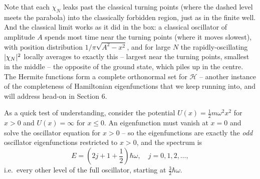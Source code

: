 \documentclass[a4paper]{scrartcl}
\begin{document}
\begin{center}
\end{center}

Note that each $\chi_N$ leaks past the classical turning points (where the dashed level meets the parabola) into the classically forbidden region, just as in the finite well. And the classical limit works as it did in the box: a classical oscillator of amplitude $A$ spends most time near the turning points (where it moves slowest), with position distribution $1/\pi\sqrt{A^2 - x^2}$, and for large $N$ the rapidly-oscillating $\lvert\chi_N\rvert^2$ locally averages to exactly this -- largest near the turning points, smallest in the middle -- the opposite of the ground state, which piles up in the centre. The Hermite functions form a complete orthonormal set for $\mathcal{H}$ -- another instance of the completeness of Hamiltonian eigenfunctions that we keep running into, and will address head-on in Section 6.

\begin{example}
    As a quick test of understanding, consider the potential $U(x) = \frac{1}{2}m\omega^2 x^2$ for $x > 0$ and $U(x) = \infty$ for $x \leq 0$. An eigenfunction must vanish at $x = 0$ and solve the oscillator equation for $x > 0$ -- so the eigenfunctions are exactly the \emph{odd} oscillator eigenfunctions restricted to $x > 0$, and the spectrum is
    $$
    E = \left(2j + 1 + \frac{1}{2}\right) \hbar\omega, \quad j = 0, 1, 2, \dots,
    $$
    i.e.\ every other level of the full oscillator, starting at $\frac{3}{2}\hbar\omega$.
\end{example}
\end{document}
